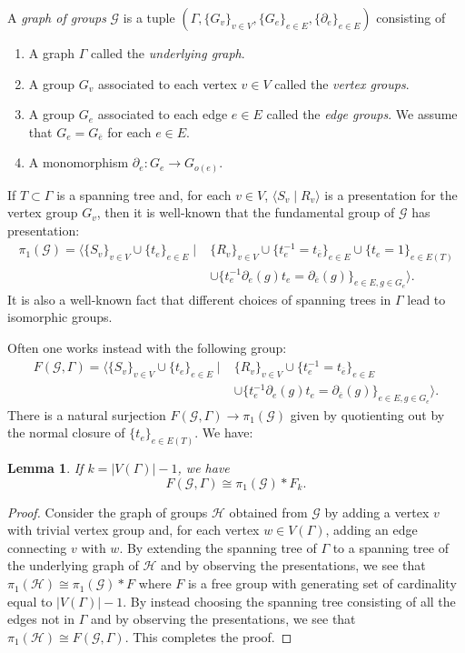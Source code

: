 \documentclass[12pt, a4paper]{amsart}
\newtheorem{lemma}[theorem]{Lemma}
\theoremstyle{definition}
\begin{document}
A \emph{graph of groups} $\mathcal{G}$ is a tuple $(\Gamma, \{G_v\}_{v\in V}, \{G_e\}_{e\in E}, \{\partial_e\}_{e\in E})$ consisting of
\begin{enumerate}
\item A graph $\Gamma$ called the \emph{underlying graph}.
\item A group $G_v$ associated to each vertex $v\in V$ called the \emph{vertex groups}.
\item A group $G_e$ associated to each edge $e\in E$ called the \emph{edge groups}. We assume that $G_e = G_{\overline{e}}$ for each $e\in E$.
\item A monomorphism $\partial_e\colon G_e\to G_{o(e)}$.
\end{enumerate}
If $T\subset \Gamma$ is a spanning tree and, for each $v\in V$, $\langle S_v \mid R_v\rangle$ is a presentation for the vertex group $G_v$, then it is well-known that the fundamental group of $\mathcal{G}$ has presentation:
\begin{align*}
\pi_1(\mathcal{G}) = \langle \{S_v\}_{v\in V}\cup \{t_e\}_{e\in E} \mid & \{R_v\}_{v\in V}\cup \{t_e^{-1} = t_{\overline{e}}\}_{e\in E} \cup \{t_e = 1\}_{e\in E(T)} \\
										& \cup\{t_{e}^{-1}\partial_e(g)t_e = \partial_{\overline{e}}(g)\}_{e\in E, g\in G_e}\rangle. 
\end{align*}
It is also a well-known fact that different choices of spanning trees in $\Gamma$ lead to isomorphic groups.

Often one works instead with the following group:
\begin{align*}
F(\mathcal{G}, \Gamma) = \langle \{S_v\}_{v\in V}\cup \{t_e\}_{e\in E} \mid & \{R_v\}_{v\in V}\cup \{t_e^{-1} = t_{\overline{e}}\}_{e\in E}\\
										& \cup\{t_{e}^{-1}\partial_e(g)t_e = \partial_{\overline{e}}(g)\}_{e\in E, g\in G_e}\rangle. 
\end{align*}
There is a natural surjection $F(\mathcal{G}, \Gamma)\to \pi_1(\mathcal{G})$ given by quotienting out by the normal closure of $\{t_e\}_{e\in E(T)}$. We have:


\begin{lemma}
\label{lem:free_prod}
If $k = |V(\Gamma)| - 1$, we have
\[
F(\mathcal{G}, \Gamma) \cong \pi_1(\mathcal{G})*F_k.
\]
\end{lemma}

\begin{proof}
Consider the graph of groups $\mathcal{H}$ obtained from $\mathcal{G}$ by adding a vertex $v$ with trivial vertex group and, for each vertex $w\in V(\Gamma)$, adding an edge connecting $v$ with $w$. By extending the spanning tree of $\Gamma$ to a spanning tree of the underlying graph of $\mathcal{H}$ and by observing the presentations, we see that $\pi_1(\mathcal{H})\cong \pi_1(\mathcal{G})*F$ where $F$ is a free group with generating set of cardinality equal to $|V(\Gamma)| - 1$. By instead choosing the spanning tree consisting of all the edges not in $\Gamma$ and by observing the presentations, we see that $\pi_1(\mathcal{H})\cong F(\mathcal{G}, \Gamma)$. This completes the proof.
\end{proof}
\end{document}
